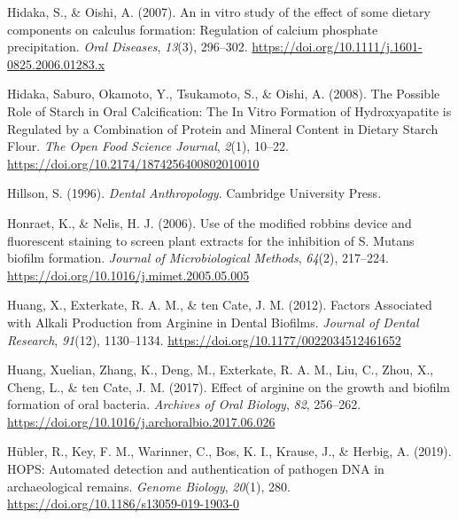 \documentclass[
  letterpaper,
]{book}
\newlength{\cslhangindent}
\newlength{\cslentryspacingunit} %
\newenvironment{CSLReferences}[2] %
 {%
  \setlength{\parindent}{0pt}
  \ifodd #1
  \let\oldpar\par
  \def\par{\hangindent=\cslhangindent\oldpar}
  \fi
  \setlength{\parskip}{#2\cslentryspacingunit}
 }%
 {}
\begin{document}
\begin{CSLReferences}{1}{0}
\leavevmode{}%
Hidaka, S., \& Oishi, A. (2007). An in vitro study of the effect of some
dietary components on calculus formation: Regulation of calcium
phosphate precipitation. \emph{Oral Diseases}, \emph{13}(3), 296--302.
\url{https://doi.org/10.1111/j.1601-0825.2006.01283.x}

\leavevmode{}%
Hidaka, Saburo, Okamoto, Y., Tsukamoto, S., \& Oishi, A. (2008). The
{Possible Role} of {Starch} in {Oral Calcification}: {The In Vitro
Formation} of {Hydroxyapatite} is {Regulated} by a {Combination} of
{Protein} and {Mineral Content} in {Dietary Starch Flour}. \emph{The
Open Food Science Journal}, \emph{2}(1), 10--22.
\url{https://doi.org/10.2174/1874256400802010010}

\leavevmode{}%
Hillson, S. (1996). \emph{Dental {Anthropology}}. {Cambridge University
Press}.

\leavevmode{}%
Honraet, K., \& Nelis, H. J. (2006). Use of the modified robbins device
and fluorescent staining to screen plant extracts for the inhibition of
{S}. Mutans biofilm formation. \emph{Journal of Microbiological
Methods}, \emph{64}(2), 217--224.
\url{https://doi.org/10.1016/j.mimet.2005.05.005}

\leavevmode{}%
Huang, X., Exterkate, R. A. M., \& ten Cate, J. M. (2012). Factors
{Associated} with {Alkali Production} from {Arginine} in {Dental
Biofilms}. \emph{Journal of Dental Research}, \emph{91}(12), 1130--1134.
\url{https://doi.org/10.1177/0022034512461652}

\leavevmode{}%
Huang, Xuelian, Zhang, K., Deng, M., Exterkate, R. A. M., Liu, C., Zhou,
X., Cheng, L., \& ten Cate, J. M. (2017). Effect of arginine on the
growth and biofilm formation of oral bacteria. \emph{Archives of Oral
Biology}, \emph{82}, 256--262.
\url{https://doi.org/10.1016/j.archoralbio.2017.06.026}

\leavevmode{}%
Hübler, R., Key, F. M., Warinner, C., Bos, K. I., Krause, J., \& Herbig,
A. (2019). {HOPS}: Automated detection and authentication of pathogen
{DNA} in archaeological remains. \emph{Genome Biology}, \emph{20}(1),
280. \url{https://doi.org/10.1186/s13059-019-1903-0}


\end{CSLReferences}
\end{document}
